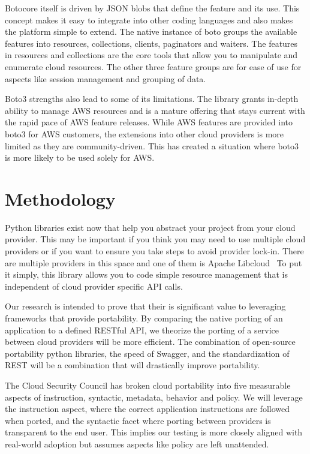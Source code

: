 Botocore itself is driven by JSON blobs that define the feature and its use. This concept 
makes it easy to integrate into other coding languages and also makes the platform simple 
to extend. The native instance of boto groups the available features into resources, 
collections, clients, paginators and waiters. The features in resources  and collections 
are the core tools that allow you to manipulate and enumerate cloud resources. The other 
three feature groups are for ease of use for aspects like session management and grouping 
of data.~\cite{hid-sp18-518-Boto3}

Boto3 strengths also lead to some of its limitations. The library grants in-depth ability 
to manage AWS resources and is a mature offering that stays current with the rapid pace 
of AWS feature releases. While AWS features are provided into boto3 for AWS customers, 
the extensions into other cloud providers is more limited as they are community-driven. 
This has created a situation where boto3 is more likely to be used solely for AWS.

\section{Methodology}

Python libraries exist now that help you abstract your project from  your cloud provider. 
This may be important if you think you may need to use multiple cloud providers or if you 
want to ensure you take steps to avoid provider lock-in. There are multiple providers in 
this space and one of them is Apache Libcloud~\cite{hid-sp18-518-LibCloud} To put it 
simply, this library allows you to code simple resource  management that is independent 
of cloud provider specific API calls.

Our research is intended to prove that their is significant value to leveraging 
frameworks that provide portability. By comparing the native porting of an application to
a defined RESTful API, we theorize the porting of a service between cloud providers will
be more efficient. The combination of open-source portability python libraries, the speed 
of Swagger, and the standardization of REST will be a combination that will drastically
improve portability.

The Cloud Security Council has broken cloud portability into five measurable aspects of 
instruction, syntactic, metadata, behavior and policy. We will leverage the instruction
aspect, where the correct application instructions are followed when ported, and the 
syntactic facet where porting between providers is transparent to the end user. This
implies our testing is more closely aligned with real-world adoption but assumes aspects
like policy are left unattended.~\cite{hid-sp18-518-Cloud-Council}

